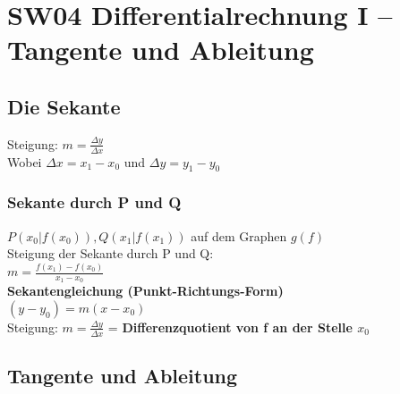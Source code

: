 \documentclass[../main.tex]{subfiles}
\begin{document}

\chapter{SW04 Differentialrechnung I -- Tangente und Ableitung}
\section{Die Sekante}
Steigung: $m = \frac{\Delta y}{\Delta x}$ \\ [7pt]
Wobei $\Delta x = x_1 - x_0$ und $\Delta y = y_1 - y_0$

\subsection{Sekante durch P und Q}
$P(x_0|f(x_0)), Q(x_1|f(x_1))$ auf dem Graphen $g(f)$ \\ [7pt]
Steigung der Sekante durch P und Q: \\ [7pt]
$m = \frac{f(x_1)-f(x_0)}{x_1 - x_0}$ \\ [7pt]
\textbf{Sekantengleichung (Punkt-Richtungs-Form)} \\ [7pt]
$(y - y_0) = m(x - x_0)$ \\ [7pt]
Steigung: $m = \frac{\Delta y}{\Delta x}$ = \textbf{Differenzquotient von f an der Stelle $x_0$}

\section{Tangente und Ableitung}
\end{document}
